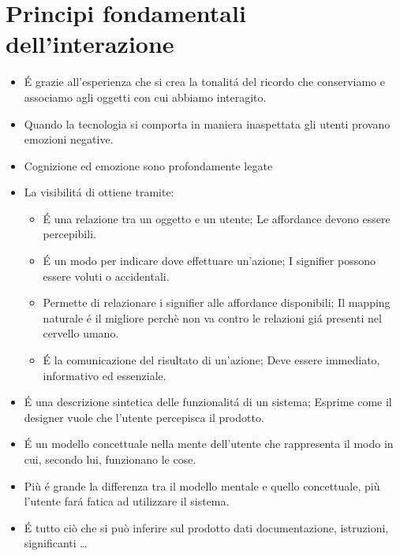 \chapter{Principi fondamentali dell'interazione}

\begin{itemize}
    \item \'E grazie all'esperienza che si crea la tonalit\'a del ricordo che conserviamo e associamo agli oggetti con cui abbiamo interagito.
    \item Quando la tecnologia si comporta in maniera inaspettata gli utenti provano emozioni negative.
    \item Cognizione ed emozione sono profondamente legate
    \item La visibilit\'a di ottiene tramite:
    \begin{itemize}
        \item {} \'E una relazione tra un oggetto e un utente; Le affordance devono essere percepibili.
        \item {} \'E un modo per indicare dove effettuare un'azione; I signifier possono essere voluti o accidentali.
        \item {} Permette di relazionare i signifier alle affordance disponibili; Il mapping naturale \'e il migliore perch\`e non va contro le relazioni gi\'a presenti nel cervello umano.
        \item {} \'E la comunicazione del risultato di un'azione; Deve essere immediato, informativo ed essenziale.
    \end{itemize}
    \item {} \'E una descrizione sintetica delle funzionalit\'a di un sistema; Esprime come il designer vuole che l'utente percepisca il prodotto.
    \item {} \'E un modello concettuale nella mente dell'utente che rappresenta il modo in cui, secondo lui, funzionano le cose.
    \item Pi\`u \'e grande la differenza tra il modello mentale e quello concettuale, pi\`u l'utente far\'a fatica ad utilizzare il sistema.
    \item {} \'E tutto ci\`o che si pu\`o inferire sul prodotto dati documentazione, istruzioni, significanti \dots
\end{itemize}